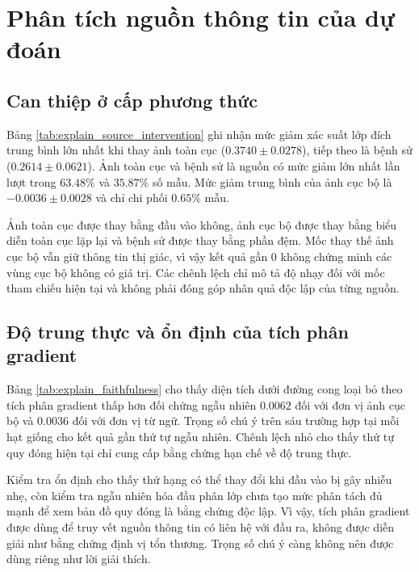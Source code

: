 \section{Phân tích nguồn thông tin của dự đoán}
\label{sec:explanation_results}

\subsection{Can thiệp ở cấp phương thức}
Bảng \ref{tab:explain_source_intervention} ghi nhận mức giảm xác suất lớp đích trung bình lớn nhất khi thay ảnh toàn cục ($0{.}3740\pm0{.}0278$), tiếp theo là bệnh sử ($0{.}2614\pm0{.}0621$). Ảnh toàn cục và bệnh sử là nguồn có mức giảm lớn nhất lần lượt trong $63{.}48\%$ và $35{.}87\%$ số mẫu. Mức giảm trung bình của ảnh cục bộ là $-0{.}0036\pm0{.}0028$ và chỉ chi phối $0{.}65\%$ mẫu.



Ảnh toàn cục được thay bằng đầu vào không, ảnh cục bộ được thay bằng biểu diễn toàn cục lặp lại và bệnh sử được thay bằng phần đệm. Mốc thay thế ảnh cục bộ vẫn giữ thông tin thị giác, vì vậy kết quả gần 0 không chứng minh các vùng cục bộ không có giá trị. Các chênh lệch chỉ mô tả độ nhạy đối với mốc tham chiếu hiện tại và không phải đóng góp nhân quả độc lập của từng nguồn.

\subsection{Độ trung thực và ổn định của tích phân gradient}
Bảng \ref{tab:explain_faithfulness} cho thấy diện tích dưới đường cong loại bỏ theo tích phân gradient thấp hơn đối chứng ngẫu nhiên $0{.}0062$ đối với đơn vị ảnh cục bộ và $0{.}0036$ đối với đơn vị từ ngữ. Trọng số chú ý trên sáu trường hợp tại mỗi hạt giống cho kết quả gần thứ tự ngẫu nhiên. Chênh lệch nhỏ cho thấy thứ tự quy đóng hiện tại chỉ cung cấp bằng chứng hạn chế về độ trung thực.



Kiểm tra ổn định cho thấy thứ hạng có thể thay đổi khi đầu vào bị gây nhiễu nhẹ, còn kiểm tra ngẫu nhiên hóa đầu phân lớp chưa tạo mức phân tách đủ mạnh để xem bản đồ quy đóng là bằng chứng độc lập. Vì vậy, tích phân gradient được dùng để truy vết nguồn thông tin có liên hệ với đầu ra, không được diễn giải như bằng chứng định vị tổn thương. Trọng số chú ý càng không nên được dùng riêng như lời giải thích.

